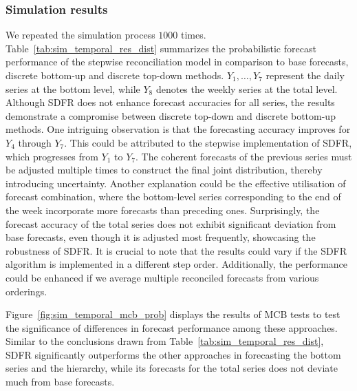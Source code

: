 \documentclass[a4paper,review,12pt,authoryear]{elsarticle}
\theoremstyle{definition}
\begin{document}
     \subsubsection{Simulation results}
     We repeated the simulation process $1000$ times.
     Table~\ref{tab:sim_temporal_res_dist} summarizes the probabilistic forecast performance of the stepwise reconciliation model in comparison to base forecasts, discrete bottom-up and discrete top-down methods.
     $Y_1,\dots,Y_7$ represent the daily series at the bottom level, while $Y_8$ denotes the weekly series at the total level.
     Although SDFR does not enhance forecast accuracies for all series, the results
     demonstrate a compromise between discrete top-down and discrete bottom-up methods.
     One intriguing observation is that the forecasting accuracy improves for $Y_4$ through $Y_7$.
     This could be attributed to the stepwise implementation of SDFR, which progresses from $Y_1$ to $Y_7$. The coherent forecasts of the previous series must be adjusted multiple times to construct the final joint distribution, thereby introducing uncertainty.
     Another explanation could be the effective utilisation of forecast combination, where the bottom-level series corresponding to the end of the week incorporate more forecasts than preceding ones.
     Surprisingly, the forecast accuracy of the total series does not exhibit significant deviation from base forecasts,  even though it is adjusted most frequently, showcasing the robustness of SDFR.
     It is crucial to note that the results could vary if the SDFR algorithm is implemented in a different step order.
     Additionally, the performance could be enhanced if we average multiple reconciled forecasts from various orderings.

     Figure~\ref{fig:sim_temporal_mcb_prob} displays the results of MCB tests to test the significance of differences in forecast performance among these approaches. Similar to the conclusions drawn from Table~\ref{tab:sim_temporal_res_dist}, SDFR significantly outperforms the other approaches in forecasting the bottom series and the hierarchy, while its forecasts for the total series does not deviate much from base forecasts.
\end{document}
